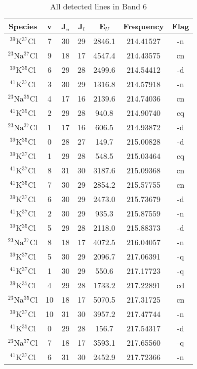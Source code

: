 \begin{table*}[htp]
\centering
\caption{All detected lines in Band 6}
\begin{tabular}{ccccccc}
\label{tab:all_detections_B6}
Species & v & J$_u$ & J$_l$ & E$_U$ & Frequency & Flag \\
\hline
$^{39}$K$^{37}$Cl & 7 & 30 & 29 & 2846.1 & 214.41527 & -n \\
$^{23}$Na$^{37}$Cl & 9 & 18 & 17 & 4547.4 & 214.43575 & cn \\
$^{39}$K$^{35}$Cl & 6 & 29 & 28 & 2499.6 & 214.54412 & -d \\
$^{41}$K$^{37}$Cl & 3 & 30 & 29 & 1316.8 & 214.57918 & -n \\
$^{23}$Na$^{35}$Cl & 4 & 17 & 16 & 2139.6 & 214.74036 & cn \\
$^{41}$K$^{35}$Cl & 2 & 29 & 28 & 940.8 & 214.90740 & cq \\
$^{23}$Na$^{37}$Cl & 1 & 17 & 16 & 606.5 & 214.93872 & -d \\
$^{39}$K$^{35}$Cl & 0 & 28 & 27 & 149.7 & 215.00828 & -d \\
$^{39}$K$^{37}$Cl & 1 & 29 & 28 & 548.5 & 215.03464 & cq \\
$^{41}$K$^{37}$Cl & 8 & 31 & 30 & 3187.6 & 215.09368 & cn \\
$^{41}$K$^{35}$Cl & 7 & 30 & 29 & 2854.2 & 215.57755 & cn \\
$^{39}$K$^{37}$Cl & 6 & 30 & 29 & 2473.0 & 215.73679 & -d \\
$^{41}$K$^{37}$Cl & 2 & 30 & 29 & 935.3 & 215.87559 & -n \\
$^{39}$K$^{35}$Cl & 5 & 29 & 28 & 2118.0 & 215.88373 & -d \\
$^{23}$Na$^{37}$Cl & 8 & 18 & 17 & 4072.5 & 216.04057 & -n \\
$^{39}$K$^{37}$Cl & 5 & 30 & 29 & 2096.7 & 217.06391 & -q \\
$^{41}$K$^{37}$Cl & 1 & 30 & 29 & 550.6 & 217.17723 & -q \\
$^{39}$K$^{35}$Cl & 4 & 29 & 28 & 1733.2 & 217.22891 & cd \\
$^{23}$Na$^{35}$Cl & 10 & 18 & 17 & 5070.5 & 217.31725 & cn \\
$^{39}$K$^{37}$Cl & 10 & 31 & 30 & 3957.2 & 217.47744 & -n \\
$^{41}$K$^{35}$Cl & 0 & 29 & 28 & 156.7 & 217.54317 & -d \\
$^{23}$Na$^{37}$Cl & 7 & 18 & 17 & 3593.1 & 217.65560 & -q \\
$^{41}$K$^{37}$Cl & 6 & 31 & 30 & 2452.9 & 217.72366 & -n \\

\end{tabular}
\end{table*}
